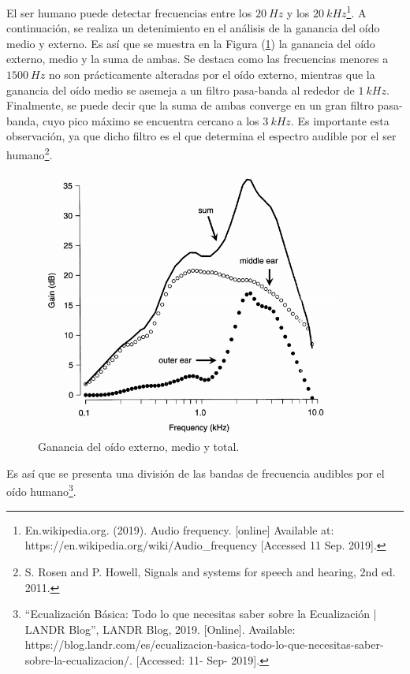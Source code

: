 \documentclass[a4paper]{article}
\begin{document}
El ser humano puede detectar frecuencias entre los $20 \ Hz$ y los $20 \ kHz$\footnote{En.wikipedia.org. (2019). Audio frequency. [online] Available at: https://en.wikipedia.org/wiki/Audio\_frequency [Accessed 11 Sep. 2019].}. A continuación, se realiza un detenimiento en el análisis de la ganancia del oído medio y externo. Es así que se muestra en la Figura (\ref{fig:oidoganancia}) la ganancia del oído externo, medio y la suma de ambas. Se destaca como las frecuencias menores a $1500 \ Hz$ no son prácticamente alteradas por el oído externo, mientras que la ganancia del oído medio se asemeja a un filtro pasa-banda al rededor de $1 \ kHz$. Finalmente, se puede decir que la suma de ambas converge en un gran filtro pasa-banda, cuyo pico máximo se encuentra cercano a los $3 \ kHz$. Es importante esta observación, ya que dicho filtro es el que determina el espectro audible por el ser humano\footnote{S. Rosen and P. Howell, Signals and systems for speech and hearing, 2nd ed. 2011.}. 

\begin{figure}[H]
\centering
	\includegraphics[width=0.9\textwidth]{Imagenes/Ganancia-del-oido-externo-y-medio.png}
	\caption{Ganancia del oído externo, medio y total.}
	\label{fig:oidoganancia}
\end{figure}

Es así que se presenta una división de las bandas de frecuencia audibles por el oído humano\footnote{``Ecualización Básica: Todo lo que necesitas saber sobre la Ecualización | LANDR Blog'', LANDR Blog, 2019. [Online]. Available: https://blog.landr.com/es/ecualizacion-basica-todo-lo-que-necesitas-saber-sobre-la-ecualizacion/. [Accessed: 11- Sep- 2019].}.
\end{document}
